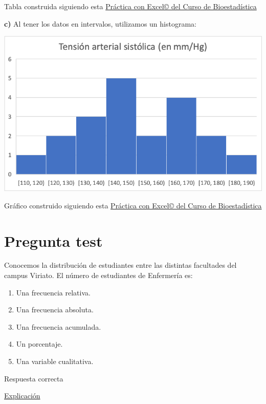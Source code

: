 \documentclass[
]{book}
\providecommand{\tightlist}{%
  \setlength{\itemsep}{0pt}\setlength{\parskip}{0pt}}
\begin{document}
Tabla construida siguiendo esta \href{https://1fjmanzano.github.io/bioestadistica/tablas-de-frecuencias.html\#tablas-de-frecuencias-pr\%C3\%A1ctica-3-con-excel}{Práctica con Excel© del Curso de Bioestadística}

\textbf{c)} Al tener los datos en intervalos, utilizamos un histograma:

\includegraphics[width=10.03in]{img/1_7}

Gráfico construido siguiendo esta \href{https://1fjmanzano.github.io/bioestadistica/histogramas.html\#histogramas-con-excel-pr\%C3\%A1cticas}{Práctica con Excel© del Curso de Bioestadística}

\hypertarget{pregunta-test-20}{%
\section{Pregunta test}\label{pregunta-test-20}}

Conocemos la distribución de estudiantes entre las distintas facultades del campus Viriato. El número de estudiantes de Enfermería es:

\begin{enumerate}
\def\labelenumi{\alph{enumi})}
\tightlist
\item
  Una frecuencia relativa.
\item
  Una frecuencia absoluta.
\item
  Una frecuencia acumulada.
\item
  Un porcentaje.
\item
  Una variable cualitativa.
\end{enumerate}

Respuesta correcta

\href{https://1fjmanzano.github.io/bioestadistica/tablas-de-frecuencias.html}{Explicación}
\end{document}
